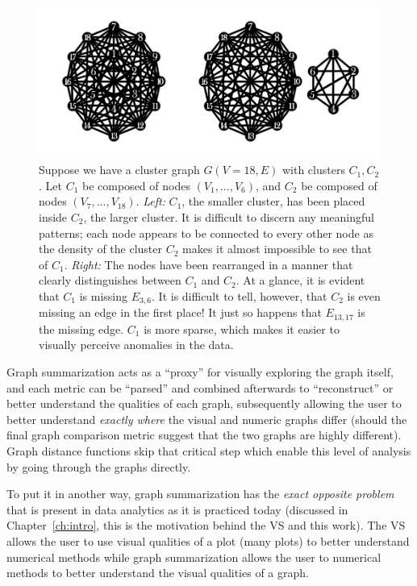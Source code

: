 \begin{figure}[htb]
	\begin{center}
		\includegraphics[width=1\linewidth]{ch-gc/figures/arr_density}
		\caption[Difficulties with graph visualization.]{
		Suppose we have a cluster graph $G(V = 18,E)$ with clusters $C_1,C_2$. 
		Let $C_1$ be composed of nodes $(V_1,...,V_6)$, and $C_2$ be composed 
		of nodes $(V_7,...,V_18)$. 
		\textit{Left:} $C_1$, the smaller cluster, has been placed inside 
		$C_2$, the larger cluster. It is difficult to discern any meaningful 
		patterns; each node appears to be connected to every other node as the 
		density of the cluster $C_2$ makes it almost impossible to see that of 
		$C_1$.
		\textit{Right:} The nodes have been rearranged in a manner that clearly 
		distinguishes between $C_1$ and $C_2$. At a glance, it is evident that 
		$C_1$ is missing $E_{3,6}$. It is difficult to tell, however, that 
		$C_2$ is even missing an edge in the first place! It just so happens 
		that $E_{13,17}$ is the missing edge.
		$C_1$ is more sparse, which makes it easier to visually perceive 
		anomalies in the data.}
		\label{fig:gc:arr_density}
	\end{center}
\end{figure}

Graph summarization acts as a ``proxy'' for visually exploring the graph 
itself, and each metric can be ``parsed'' and combined afterwards to 
``reconstruct'' or better understand the qualities of each graph, subsequently 
allowing the user to better understand \textit{exactly where} the visual and 
numeric graphs differ (should the final graph comparison metric suggest that 
the two graphs are highly different). Graph distance functions skip that 
critical step which enable this level of analysis by going through the graphs 
directly.

To put it in another way, graph summarization has the \textit{exact opposite 
problem} that is present in data analytics as it is practiced today (discussed 
in Chapter~\ref{ch:intro}, this is the motivation behind the VS and this work). 
The VS allows the user to use visual qualities of a plot (many plots) to better 
understand numerical methods while graph summarization allows the user to 
numerical methods to better understand the visual qualities of a graph. 

